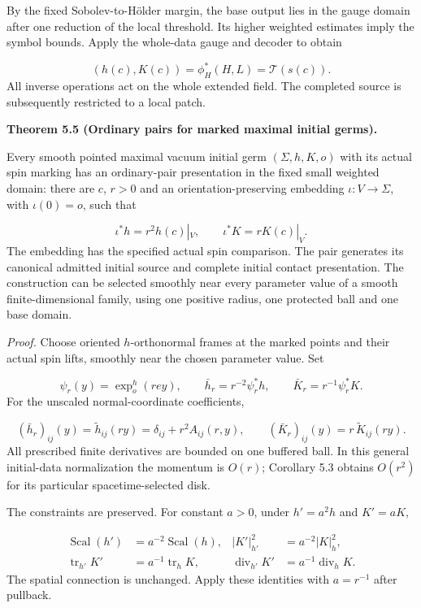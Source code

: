 \documentclass[
  english,
  11pt,
  reqno]{amsart}
\makeatletter
\newcommand{\pandocstatementheading}[1]{%
  \par\addpenalty{\@beginparpenalty}%
  \addvspace{.5\baselineskip plus .2\baselineskip minus .2\baselineskip}%
  {\normalfont\bfseries #1\par}%
  \nobreak\@afterindenttrue\@afterheading
}
\makeatother
\begin{document}
By the fixed Sobolev-to-Hölder margin, the base output lies in the gauge
domain after one reduction of the local threshold. Its higher weighted
estimates imply the symbol bounds. Apply the whole-data gauge and
decoder to obtain

\label{eq:submission-extended-data-decoding} \[
(h(c),K(c))
=
\phi_H^*(H,L)
=
\mathcal T(s(c)).
\] All inverse operations act on the whole extended field. The completed
source is subsequently restricted to a local patch.

\pandocstatementheading{\leavevmode{}\label{thm:submission-marked-initial-coverage}Theorem 5.5 (Ordinary pairs for marked maximal initial germs).}

Every smooth pointed maximal vacuum initial germ \((\Sigma,h,K,o)\) with
its actual spin marking has an ordinary-pair presentation in the fixed
small weighted domain: there are \(c\), \(r>0\) and an
orientation-preserving embedding \(\iota:V\to\Sigma\), with
\(\iota(0)=o\), such that

\label{eq:submission-initial-coverage} \[
\iota^*h=r^2h(c)|_V,
\qquad
\iota^*K=rK(c)|_V.
\] The embedding has the specified actual spin comparison. The pair
generates its canonical admitted initial source and complete initial
contact presentation. The construction can be selected smoothly near
every parameter value of a smooth finite-dimensional family, using one
positive radius, one protected ball and one base domain.

\emph{Proof.} Choose oriented \(h\)-orthonormal frames at the marked
points and their actual spin lifts, smoothly near the chosen parameter
value. Set

\label{eq:submission-initial-normalization} \[
\psi_r(y)=\exp^h_o(r e y),
\qquad
\bar h_r=r^{-2}\psi_r^*h,
\qquad
\bar K_r=r^{-1}\psi_r^*K.
\] For the unscaled normal-coordinate coefficients,

\label{eq:submission-initial-smallness} \[
(\bar h_r)_{ij}(y)=\widetilde h_{ij}(ry)
=\delta_{ij}+r^2A_{ij}(r,y),
\qquad
(\bar K_r)_{ij}(y)=r\,\widetilde K_{ij}(ry).
\] All prescribed finite derivatives are bounded on one buffered ball.
In this general initial-data normalization the momentum is \(O(r)\);
Corollary 5.3 obtains \(O(r^2)\) for its particular spacetime-selected
disk.

The constraints are preserved. For constant \(a>0\), under \(h'=a^2h\)
and \(K'=aK\),

\label{eq:submission-constraint-scaling} \[
\begin{aligned}
\operatorname{Scal}(h')&=a^{-2}\operatorname{Scal}(h),
&
|K'|_{h'}^2&=a^{-2}|K|_h^2,\\
\operatorname{tr}_{h'}K'&=a^{-1}\operatorname{tr}_hK,
&
\operatorname{div}_{h'}K'&=a^{-1}\operatorname{div}_hK.
\end{aligned}
\] The spatial connection is unchanged. Apply these identities with
\(a=r^{-1}\) after pullback.
\end{document}
